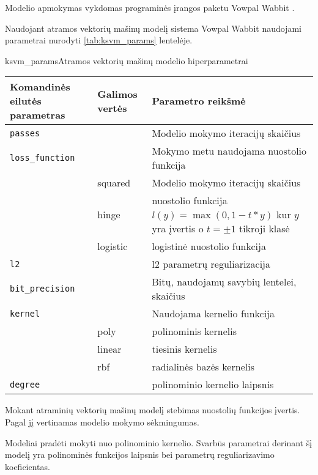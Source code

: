 
Modelio apmokymas vykdomas programinės įrangos paketu Vowpal Wabbit \cite{vw}.


Naudojant atramos vektorių mašinų modelį sistema Vowpal Wabbit naudojami parametrai nurodyti \vref{tab:ksvm_params} lentelėje.

\begin{ktutable}{ksvm_params}{Atramos vektorių mašinų modelio hiperparametrai}
    \begin{tabular}{| l | l | p{7cm}|}
    \hline
        Komandinės eilutės parametras & Galimos vertės & Parametro reikšmė\\ \hline
        \texttt{passes} &  & Modelio mokymo iteracijų skaičius \\ \hline
        \texttt{loss\_function} &          & Mokymo metu naudojama nuostolio funkcija \\
                               & squared  & Modelio mokymo iteracijų skaičius \\
                               & hinge    & nuostolio funkcija $l(y) = \max(0, 1 - t * y)$ kur $y$ yra įvertis o $t = \pm 1$ tikroji klasė  \\
                               & logistic & logistinė nuostolio funkcija \\ \hline
        \texttt{l2} & & l2 parametrų reguliarizacija \\ \hline
        \texttt{bit\_precision} & & Bitų, naudojamų savybių lentelei, skaičius\\ \hline
        \texttt{kernel} & & Naudojama kernelio funkcija   \\
                       & poly & polinominis kernelis     \\
                       & linear & tiesinis kernelis      \\
                       & rbf & radialinės bazės kernelis \\ \hline
        \texttt{degree} & & polinominio kernelio laipsnis \\ \hline
    \end{tabular}
\end{ktutable}

Mokant atraminių vektorių mašinų modelį stebimas nuostolių funkcijos įvertis. Pagal jį vertinamas modelio mokymo sėkmingumas.

Modeliai pradėti mokyti nuo polinominio kernelio. Svarbūs parametrai derinant šį modelį yra polinominės funkcijos laipsnis bei parametrų reguliarizavimo koeficientas.

